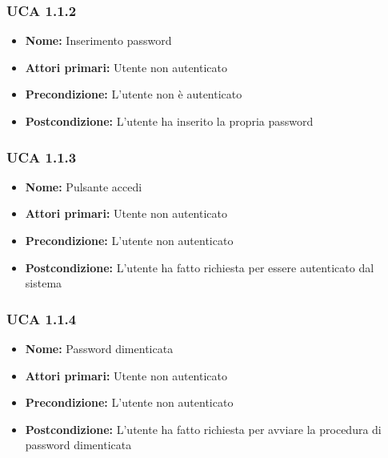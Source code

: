 \subsubsection{UCA 1.1.2}%
\begin{itemize}
\item \textbf{Nome:} Inserimento password
\item \textbf{Attori primari:} Utente non autenticato
\item \textbf{Precondizione:} L’utente non è autenticato
\item \textbf{Postcondizione:} L’utente ha inserito la propria password
\end{itemize}

\subsubsection{UCA 1.1.3}%
\begin{itemize}
\item \textbf{Nome:} Pulsante accedi
\item \textbf{Attori primari:} Utente non autenticato
\item \textbf{Precondizione:} L'utente non autenticato
\item \textbf{Postcondizione:} L'utente ha fatto richiesta per essere autenticato dal sistema 
\end{itemize}

\subsubsection{UCA 1.1.4}%
\begin{itemize}
\item \textbf{Nome:} Password dimenticata
\item \textbf{Attori primari:} Utente non autenticato
\item \textbf{Precondizione:}  L'utente non autenticato
\item \textbf{Postcondizione:} L'utente ha fatto richiesta per avviare la procedura di password dimenticata
\end{itemize}

